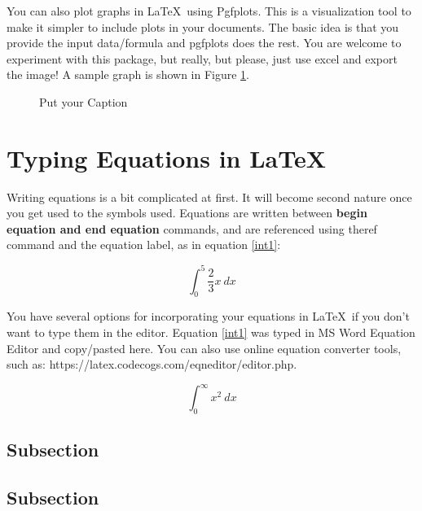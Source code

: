 \noindent You can also plot graphs in \LaTeX\ using Pgfplots. This is a visualization tool to make it simpler to include plots in your documents. The basic idea is that you provide the input data/formula and pgfplots does the rest. You are welcome to experiment with this package, but really, but please, just use excel and export the image! A sample graph is shown in Figure \ref{fig:my_label}.

\begin{figure}[!ht]
    \centering
    \caption{Put your Caption}
    \label{fig:my_label}
\end{figure}





\newpage
\section{Typing Equations in \LaTeX}

\noindent Writing equations is a bit complicated at first. It will become second nature once you get used to the symbols used. Equations are written between \textbf{begin equation and end equation} commands, and are referenced using theref command and the equation label, as in equation \ref{int1}:

\begin{equation}
\label{int1}
\int_{0}^{5}{\frac{2}{3}x}\ dx
\end{equation}

\noindent  You have several options for incorporating your equations in \LaTeX\ if you don't want to type them in the editor. Equation \ref{int1} was typed in MS Word Equation Editor and copy/pasted here. You can also use online equation converter tools, such as: \newline
https://latex.codecogs.com/eqneditor/editor.php.


\begin{equation}
\label{int2}
\int_{0}^{\infty}x^{2}\ dx
\end{equation}



\subsection{Subsection}
\noindent \lipsum[1][1-3] %

\subsection{Subsection}

\noindent \lipsum[1][4-6] %